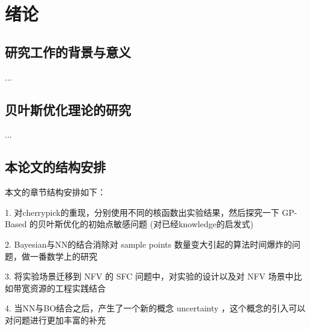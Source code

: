 
\chapter{绪论}
\section{研究工作的背景与意义}



...
\section{贝叶斯优化理论的研究}
...

\section{本论文的结构安排}
本文的章节结构安排如下：

1. 对cherrypick的重现，分别使用不同的核函数出实验结果，然后探究一下 GP-Based 的贝叶斯优化的初始点敏感问题 (对已经knowledge的启发式) 

2. Bayesian与NN的结合消除对 sample points 数量变大引起的算法时间爆炸的问题，做一番数学上的研究 

3. 将实验场景迁移到 NFV 的 SFC 问题中，对实验的设计以及对 NFV 场景中比如带宽资源的工程实践结合 

4. 当NN与BO结合之后，产生了一个新的概念 uncertainty ，这个概念的引入可以对问题进行更加丰富的补充 

